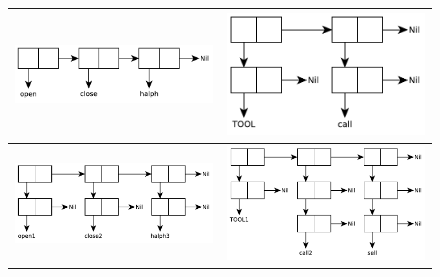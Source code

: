 \documentclass[a4paper]{report}
\begin{document}
\begin{figure}[!h]
	\begin{tabular}{|l|l|}
		\hline
		\includegraphics[scale=0.475]{inc/img/task0101.pdf} & \includegraphics[scale=0.475]{inc/img/task0104.pdf} \\\hline
		\includegraphics[scale=0.475]{inc/img/task0102.pdf} & \includegraphics[scale=0.475]{inc/img/task0105.pdf} \\\hline

\end{tabular}
\end{figure}
\end{document}
